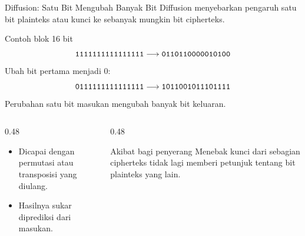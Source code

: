 \documentclass[aspectratio=169,11pt]{beamer}
\begin{document}
\begin{frame}{Diffusion: Satu Bit Mengubah Banyak Bit}
    \footnotesize
    Diffusion menyebarkan pengaruh satu bit plainteks atau kunci ke
    sebanyak mungkin bit cipherteks.
    \begin{exampleblock}{Contoh blok 16 bit}
        \footnotesize
        \[
            \texttt{1111111111111111} \longrightarrow
            \texttt{0110110000010100}
        \]
        Ubah bit pertama menjadi 0:
        \[
            \texttt{0111111111111111} \longrightarrow
            \texttt{1011001011101111}
        \]
        Perubahan satu bit masukan mengubah banyak bit keluaran.
    \end{exampleblock}
    \begin{columns}[T,onlytextwidth]
        \begin{column}{0.48\textwidth}
            \begin{itemize}
                \item Dicapai dengan permutasi atau transposisi yang
                      diulang.
                \item Hasilnya sukar diprediksi dari masukan.
            \end{itemize}
        \end{column}
        \begin{column}{0.48\textwidth}
            \begin{block}{Akibat bagi penyerang}
                \footnotesize
                Menebak kunci dari sebagian cipherteks tidak lagi
                memberi petunjuk tentang bit plainteks yang lain.
            \end{block}
        \end{column}
    \end{columns}
\end{frame}
\end{document}
